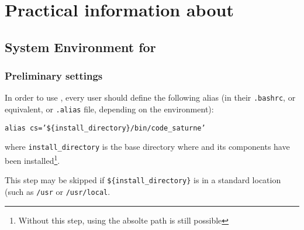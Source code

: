 \section{Practical information about \CS}

\subsection{System Environment for \CS}

\subsubsection{Preliminary settings}
\label{prg_environementCS}

In order to use \CS, every user should define the following alias (in their \texttt{.bashrc}, 
or equivalent, or \texttt{.alias} file, depending on the environment):
\begin{center}
\texttt{alias cs='\$\{install\_directory\}/bin/code\_saturne'}
\end{center}
where \texttt{install\_directory} is the base directory where
\CS and its components have been installed\footnote{Without this step, using the absolte path is still possible}.

This step may be skipped if \texttt{\$\{install\_directory\}} is in a standard location (such as \texttt{/usr} or \texttt{/usr/local}.


